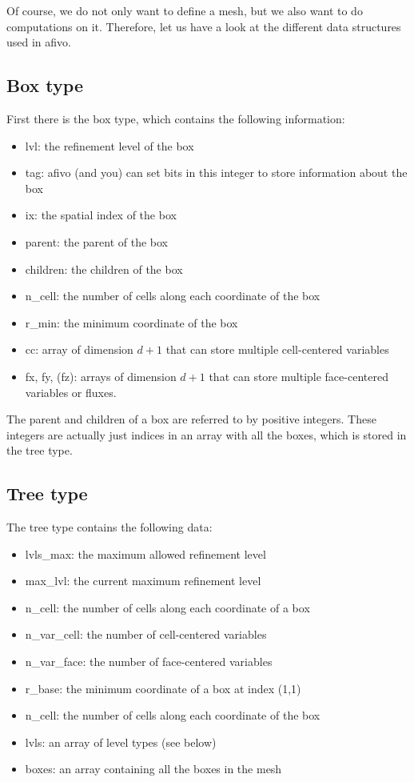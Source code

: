 \documentclass[a4paper, a4wide]{article}
\begin{document}
Of course, we do not only want to define a mesh, but we also want to do
computations on it. Therefore, let us have a look at the different data
structures used in afivo.

\subsection{Box type}
\label{sec:box-type}

First there is the box type, which contains the following information:
\begin{itemize}
  \item lvl: the refinement level of the box
  \item tag: afivo (and you) can set bits in this integer to store information
  about the box
  \item ix: the spatial index of the box
  \item parent: the parent of the box
  \item children: the children of the box
  \item n\_cell: the number of cells along each coordinate of the box
  \item r\_min: the minimum coordinate of the box
  \item cc: array of dimension $d+1$ that can store multiple cell-centered
  variables
  \item fx, fy, (fz): arrays of dimension $d+1$ that can store multiple
  face-centered variables or fluxes.
\end{itemize}

The parent and children of a box are referred to by positive integers.
These integers are actually just indices in an array with all the boxes, which
is stored in the tree type.

\subsection{Tree type}
\label{sec:tree-type}

The tree type contains the following data:
\begin{itemize}
  \item lvls\_max: the maximum allowed refinement level
  \item max\_lvl: the current maximum refinement level
  \item n\_cell: the number of cells along each coordinate of a box
  \item n\_var\_cell: the number of cell-centered variables
  \item n\_var\_face: the number of face-centered variables
  \item r\_base: the minimum coordinate of a box at index (1,1)
  \item n\_cell: the number of cells along each coordinate of the box
  \item lvls: an array of level types (see below)
  \item boxes: an array containing all the boxes in the mesh
\end{itemize}
\end{document}
